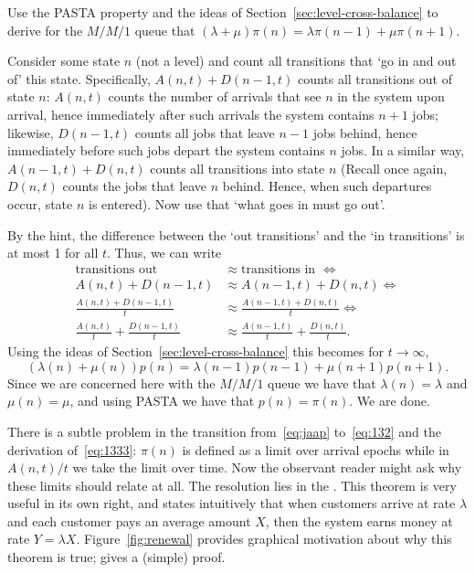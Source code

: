 \begin{exercise}
  Use the PASTA property and the ideas of Section~\ref{sec:level-cross-balance}
 to derive for the $M/M/1$ queue that
$(\lambda + \mu) \pi(n) = \lambda \pi(n-1) + \mu \pi(n+1)$.
  \begin{hint}
    Consider some state $n$ (not a level) and count all transitions that `go in and
    out of' this state. Specifically, $A(n,t) + D(n-1,t)$ counts all
    transitions out of state $n$: $A(n,t)$ counts the number of
    arrivals that see $n$ in the system upon arrival, hence
    immediately after such arrivals the system contains $n+1$ jobs;
    likewise, $D(n-1,t)$ counts all jobs that leave $n-1$ jobs behind,
    hence immediately before such jobs depart the system contains $n$
    jobs.  In a similar way, $A(n-1,t) + D(n,t)$ counts all
    transitions into state $n$ (Recall once again, $D(n,t)$ counts the
    jobs that leave $n$ behind. Hence, when such departures occur,
    state $n$ is entered). Now use that `what goes in must go out'.    
  \end{hint}
  \begin{solution}
By  the hint,  the difference between the `out
    transitions' and the `in transitions' is at most 1 for all $t$. Thus,  we can write
    \begin{align*}
\text{transitions out } &\approx \text{transitions in } \iff \\
      A(n,t) + D(n-1,t) &\approx A(n-1,t) + D(n,t)  \iff \\
      \frac{A(n,t) + D(n-1,t)}t &\approx \frac{A(n-1,t) + D(n, t)}t \iff \\
      \frac{A(n,t)}t + \frac{D(n-1,t)}t &\approx \frac{A(n-1,t)}t + \frac{D(n,t)}t.
    \end{align*}
Using the ideas of Section~\ref{sec:level-cross-balance} this becomes for $t\to\infty$, 
\begin{equation*}
  (\lambda(n) +\mu(n))p(n) = \lambda(n-1)p(n-1) + \mu(n+1)p(n+1).
\end{equation*}
Since we are concerned here with the $M/M/1$ queue we have that
$ \lambda(n) = \lambda$ and $\mu(n) = \mu$, and using PASTA we have
that $p(n) = \pi(n)$. We are done.
  \end{solution}
\end{exercise}



There is a subtle problem in the transition from~\eqref{eq:jaap} to~\eqref{eq:132} and the derivation
of~\eqref{eq:1333}: $\pi(n)$ is defined as a limit over arrival epochs
while in $A(n,t)/t$ we take the limit over time. Now the observant
reader might ask why these limits should relate at all.  The
resolution lies in the . This
theorem is very useful in its own right, and states  intuitively that 
when customers arrive at rate $\lambda$ and each customer pays an average amount $X$, then the system earns money at rate $Y=\lambda X$.  Figure~\ref{fig:renewal} provides graphical motivation about why this theorem is true; \citet{el-taha98:_sampl_path_analy_queuein_system}
gives  a (simple) proof.

